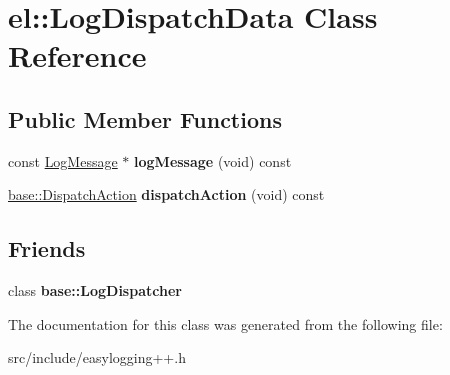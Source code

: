\hypertarget{classel_1_1_log_dispatch_data}{}\section{el\+:\+:Log\+Dispatch\+Data Class Reference}
\label{classel_1_1_log_dispatch_data}
\subsection*{Public Member Functions}
\begin{DoxyCompactItemize}
\item 
\mbox{\label{classel_1_1_log_dispatch_data_a456673f303f61bd311333fa527f2e664}} 
const \hyperlink{classel_1_1_log_message}{Log\+Message} $\ast$ {\bfseries log\+Message} (void) const
\item 
\mbox{\label{classel_1_1_log_dispatch_data_aa7f834fbd4c8440d25ba1958ccf51ea7}} 
\hyperlink{namespaceel_1_1base_a3aa2563d38e47388ba242a1694fc2839}{base\+::\+Dispatch\+Action} {\bfseries dispatch\+Action} (void) const
\end{DoxyCompactItemize}
\subsection*{Friends}
\begin{DoxyCompactItemize}
\item 
\mbox{\label{classel_1_1_log_dispatch_data_a84d22f9ad5b796e49ff5f15a8c32773d}} 
class {\bfseries base\+::\+Log\+Dispatcher}
\end{DoxyCompactItemize}


The documentation for this class was generated from the following file\+:\begin{DoxyCompactItemize}
\item 
src/include/easylogging++.\+h\end{DoxyCompactItemize}

